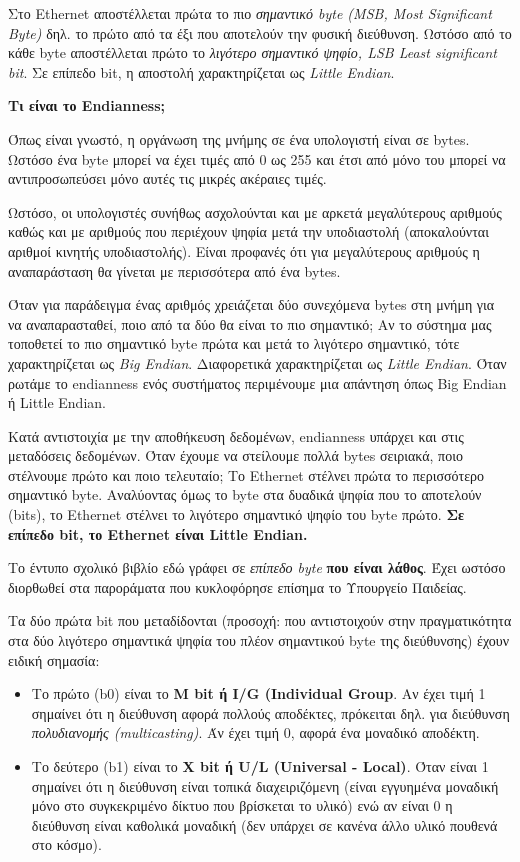 Στο Ethernet αποστέλλεται πρώτα το πιο \emph{σημαντικό byte (MSB, Most Significant Byte)} δηλ. το πρώτο από τα έξι που αποτελούν την φυσική διεύθυνση. Ωστόσο από το κάθε byte αποστέλλεται πρώτο το \emph{λιγότερο σημαντικό ψηφίο, LSB Least significant bit}. Σε επίπεδο bit, η αποστολή χαρακτηρίζεται ως \emph{Little Endian}.

\begin{inthebox}
\textbf{Τι είναι το Endianness;}

Όπως είναι γνωστό, η οργάνωση της μνήμης σε ένα υπολογιστή είναι σε bytes. Ωστόσο ένα byte μπορεί να έχει τιμές από 0 ως 255 και έτσι από μόνο του μπορεί να αντιπροσωπεύσει μόνο αυτές τις μικρές ακέραιες τιμές.

Ωστόσο, οι υπολογιστές συνήθως ασχολούνται και με αρκετά μεγαλύτερους αριθμούς καθώς και με αριθμούς που περιέχουν ψηφία μετά την υποδιαστολή (αποκαλούνται αριθμοί κινητής υποδιαστολής). Είναι προφανές ότι για μεγαλύτερους αριθμούς η αναπαράσταση θα γίνεται με περισσότερα από ένα bytes.

Όταν για παράδειγμα ένας αριθμός χρειάζεται δύο συνεχόμενα bytes στη μνήμη για να αναπαρασταθεί, ποιο από τα δύο θα είναι το πιο σημαντικό; Αν το σύστημα μας τοποθετεί το πιο σημαντικό byte πρώτα και μετά το λιγότερο σημαντικό, τότε χαρακτηρίζεται ως \emph{Big Endian}. Διαφορετικά χαρακτηρίζεται ως \emph{Little Endian}. Όταν ρωτάμε το endianness ενός συστήματος περιμένουμε μια απάντηση όπως Big Endian ή Little Endian.

Κατά αντιστοιχία με την αποθήκευση δεδομένων, endianness υπάρχει και στις μεταδόσεις δεδομένων. Όταν έχουμε να στείλουμε πολλά bytes σειριακά, ποιο στέλνουμε πρώτο και ποιο τελευταίο; Tο Ethernet στέλνει πρώτα το περισσότερο σημαντικό byte. Αναλύοντας όμως το byte στα δυαδικά ψηφία που το αποτελούν (bits), το Ethernet στέλνει το λιγότερο σημαντικό ψηφίο του byte πρώτο. \textbf{Σε επίπεδο bit, το Ethernet είναι Little Endian.}

Το έντυπο σχολικό βιβλίο εδώ γράφει σε \emph{επίπεδο byte} \textbf{που είναι λάθος}. Έχει ωστόσο διορθωθεί στα παροράματα που κυκλοφόρησε επίσημα το Υπουργείο Παιδείας.\\
\end{inthebox}

Τα δύο πρώτα bit που μεταδίδονται (προσοχή: που αντιστοιχούν στην πραγματικότητα στα δύο λιγότερο σημαντικά ψηφία του πλέον σημαντικού byte της διεύθυνσης) έχουν ειδική σημασία:

\begin{itemize}
\item Το πρώτο (b0) είναι το \textbf{M bit ή I/G (Individual Group}. Αν έχει τιμή 1 σημαίνει ότι η διεύθυνση αφορά πολλούς αποδέκτες, πρόκειται δηλ. για διεύθυνση \emph{πολυδιανομής (multicasting)}. Άν έχει τιμή 0, αφορά ένα μοναδικό αποδέκτη.
\item Το δεύτερο (b1) είναι το \textbf{X bit ή U/L (Universal - Local)}. Όταν είναι 1 σημαίνει ότι η διεύθυνση είναι τοπικά διαχειριζόμενη (είναι εγγυημένα μοναδική μόνο στο συγκεκριμένο δίκτυο που βρίσκεται το υλικό) ενώ αν είναι 0 η διεύθυνση είναι καθολικά μοναδική (δεν υπάρχει σε κανένα άλλο υλικό πουθενά στο κόσμο).
\end{itemize}

